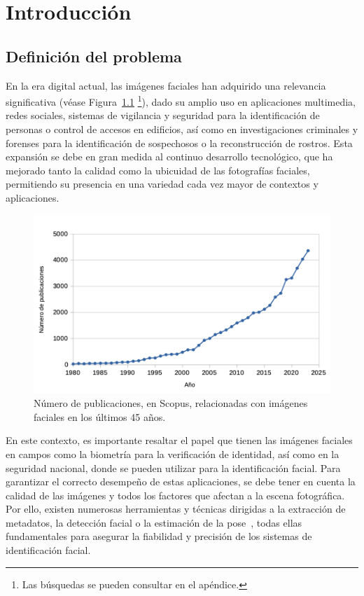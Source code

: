 \chapter{Introducción}
\thispagestyle{empty}

\section{Definición del problema}

En la era digital actual, las imágenes faciales han adquirido una relevancia significativa (véase Figura~\ref{fig1} \footnote{Las búsquedas se pueden consultar en el apéndice.}), dado su amplio uso  en aplicaciones multimedia, redes sociales, sistemas de vigilancia y seguridad para la identificación de personas o control de accesos en edificios, así como en investigaciones criminales y forenses para la identificación de sospechosos o la reconstrucción de rostros.
Esta expansión se debe en gran medida al continuo desarrollo tecnológico, que ha mejorado tanto la calidad como la ubicuidad de las fotografías faciales, permitiendo su presencia en una variedad cada vez mayor de contextos y aplicaciones.

\begin{figure}[h]
	\centering
	\includegraphics[scale=0.6]{imagenes/cap1/tabla_facial_images.png}
	\caption[Número de publicaciones de imágenes faciales.]{Número de publicaciones, en Scopus, relacionadas con imágenes faciales en los últimos 45 años.}\label{fig1}
\end{figure}

En este contexto, es importante resaltar el papel que tienen las imágenes faciales en campos como la biometría para la verificación de identidad, así como en la seguridad nacional, donde se pueden utilizar para la identificación facial. 
Para garantizar el correcto desempeño de estas aplicaciones, se debe tener en cuenta la calidad de las imágenes y todos los factores que afectan a la escena fotográfica.
Por ello, existen numerosas herramientas y técnicas dirigidas a la extracción de metadatos, la detección facial o la estimación de la pose~\cite{56}, todas ellas fundamentales para asegurar la fiabilidad y precisión de los sistemas de identificación facial.

